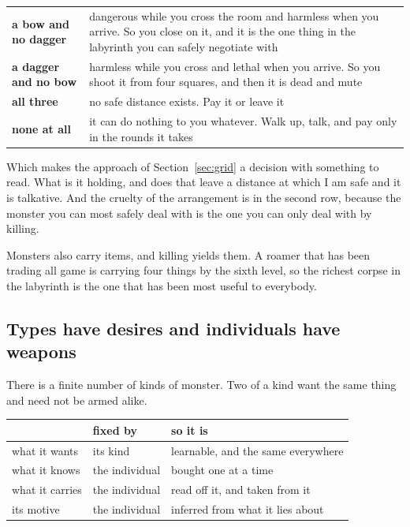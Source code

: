 \documentclass[11pt,a4paper]{article}
\begin{document}
\begin{center}
\begin{tabular}{@{}l@{\hspace{4mm}}>{\raggedright\arraybackslash}p{}@{}}
\toprule
\textbf{a bow and no dagger} & dangerous while you cross the room and harmless when you arrive. So
you close on it, and it is the one thing in the labyrinth you can safely negotiate with \\[1mm]
\textbf{a dagger and no bow} & harmless while you cross and lethal when you arrive. So you shoot it
from four squares, and then it is dead and mute \\[1mm]
\textbf{all three}           & no safe distance exists. Pay it or leave it \\[1mm]
\textbf{none at all}         & it can do nothing to you whatever. Walk up, talk, and pay only in the
rounds it takes \\
\bottomrule
\end{tabular}
\end{center}

Which makes the approach of Section~\ref{sec:grid} a decision with something to read. What is it
holding, and does that leave a distance at which I am safe and it is talkative. And the cruelty of
the arrangement is in the second row, because the monster you can most safely deal with is the one
you can only deal with by killing.

Monsters also carry items, and killing yields them. A roamer that has been trading all game is
carrying four things by the sixth level, so the richest corpse in the labyrinth is the one that has
been most useful to everybody.

\subsection{Types have desires and individuals have weapons}

There is a finite number of kinds of monster. Two of a kind want the same thing and need not be
armed alike.

\begin{center}
\begin{tabular}{@{}l@{\hspace{5mm}}l@{\hspace{5mm}}>{\raggedright\arraybackslash}p{}@{}}
\toprule
& \textbf{fixed by} & \textbf{so it is} \\
\midrule
what it wants   & its kind       & learnable, and the same everywhere \\
what it knows   & the individual & bought one at a time \\
what it carries & the individual & read off it, and taken from it \\
its motive      & the individual & inferred from what it lies about \\
\bottomrule
\end{tabular}
\end{center}
\end{document}
